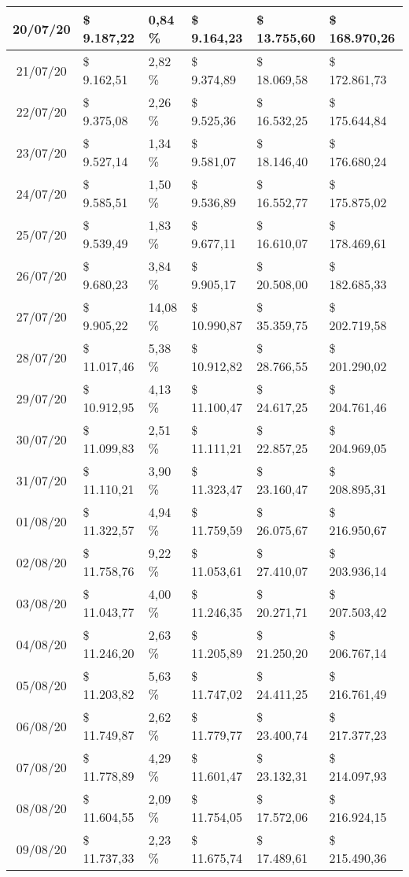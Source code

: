 \begin{small}
\begin{longtable}{|c|l|l|l|l|l|}
20/07/20 & \$ 9.187,22 & 0,84 \% & \$ 9.164,23 & \$ 13.755,60 & \$ 168.970,26 \\ \hline
21/07/20 & \$ 9.162,51 & 2,82 \% & \$ 9.374,89 & \$ 18.069,58 & \$ 172.861,73 \\ \hline
22/07/20 & \$ 9.375,08 & 2,26 \% & \$ 9.525,36 & \$ 16.532,25 & \$ 175.644,84 \\ \hline
23/07/20 & \$ 9.527,14 & 1,34 \% & \$ 9.581,07 & \$ 18.146,40 & \$ 176.680,24 \\ \hline
24/07/20 & \$ 9.585,51 & 1,50 \% & \$ 9.536,89 & \$ 16.552,77 & \$ 175.875,02 \\ \hline
25/07/20 & \$ 9.539,49 & 1,83 \% & \$ 9.677,11 & \$ 16.610,07 & \$ 178.469,61 \\ \hline
26/07/20 & \$ 9.680,23 & 3,84 \% & \$ 9.905,17 & \$ 20.508,00 & \$ 182.685,33 \\ \hline
27/07/20 & \$ 9.905,22 & 14,08 \% & \$ 10.990,87 & \$ 35.359,75 & \$ 202.719,58 \\ \hline
28/07/20 & \$ 11.017,46 & 5,38 \% & \$ 10.912,82 & \$ 28.766,55 & \$ 201.290,02 \\ \hline
29/07/20 & \$ 10.912,95 & 4,13 \% & \$ 11.100,47 & \$ 24.617,25 & \$ 204.761,46 \\ \hline
30/07/20 & \$ 11.099,83 & 2,51 \% & \$ 11.111,21 & \$ 22.857,25 & \$ 204.969,05 \\ \hline
31/07/20 & \$ 11.110,21 & 3,90 \% & \$ 11.323,47 & \$ 23.160,47 & \$ 208.895,31 \\ \hline
01/08/20 & \$ 11.322,57 & 4,94 \% & \$ 11.759,59 & \$ 26.075,67 & \$ 216.950,67 \\ \hline
02/08/20 & \$ 11.758,76 & 9,22 \% & \$ 11.053,61 & \$ 27.410,07 & \$ 203.936,14 \\ \hline
03/08/20 & \$ 11.043,77 & 4,00 \% & \$ 11.246,35 & \$ 20.271,71 & \$ 207.503,42 \\ \hline
04/08/20 & \$ 11.246,20 & 2,63 \% & \$ 11.205,89 & \$ 21.250,20 & \$ 206.767,14 \\ \hline
05/08/20 & \$ 11.203,82 & 5,63 \% & \$ 11.747,02 & \$ 24.411,25 & \$ 216.761,49 \\ \hline
06/08/20 & \$ 11.749,87 & 2,62 \% & \$ 11.779,77 & \$ 23.400,74 & \$ 217.377,23 \\ \hline
07/08/20 & \$ 11.778,89 & 4,29 \% & \$ 11.601,47 & \$ 23.132,31 & \$ 214.097,93 \\ \hline
08/08/20 & \$ 11.604,55 & 2,09 \% & \$ 11.754,05 & \$ 17.572,06 & \$ 216.924,15 \\ \hline
09/08/20 & \$ 11.737,33 & 2,23 \% & \$ 11.675,74 & \$ 17.489,61 & \$ 215.490,36 \\ \hline

\end{longtable}
\end{small}
